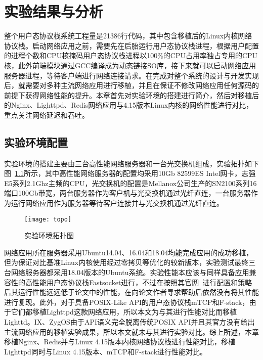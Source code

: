 \chapter{实验结果与分析}

整个用户态协议栈系统工程量是21386行代码，其中包含移植后的Linux内核网络协议栈。启动网络应用之前，需要先在后胎运行用户态协议栈进程，根据用户配置的进程个数和CPU核掩码用户态协议栈进程以100\%的CPU占用率独占专用的CPU核，此外前端模块通过GCC编译成为动态链接SO库，接下来就可以启动网络应用服务器进程，等待客户端进行网络连接请求。在完成对整个系统的设计与开发实现后，就需要对多种主流网络应用进行移植，并且在保证不修改网络应用任何源码的前提下获得网络性能的提升。本章首先对实验环境的搭建进行简介，然后对移植后的Nginx、Lighttpd、Redis网络应用与4.15版本Linux内核的网络性能进行对比，重点关注网络延迟和吞吐。

\section{实验环境配置}
实验环境的搭建主要由三台高性能网络服务器和一台光交换机组成，实验拓扑如下图~\ref{fig:topo}所示，其中高性能网络服务器的配置均采用10Gb 82599ES Intel网卡，志强E5系列2.1Ghz主频的CPU，光交换机的配置是Mellanox公司生产的SN2100系列16端口100Gb带宽，两台服务器作为客户机与光交换机通过光纤直连，一台服务器作为运行网络应用作为服务器等待客户连接并与光交换机通过光纤直连。

\vspace{-10pt}
\begin{figure}[H] %
  \centering
  \texttt{[image: topo]}
  \caption{实验环境拓扑图}
  \label{fig:topo}
\end{figure}
\vspace{-10pt}

网络应用所在服务器采用Ubuntu14.04、16.04和18.04均能完成应用的成功移植，但为保证对比基准Linux内核使用经过零拷贝等优化的较新版本，实验测试最终三台网络服务器都采用18.04版本的Ubuntu系统。实验性能本应该与同样具备应用兼容性的高性能用户态协议栈Fastsocket进行，不过在按照其官网~\cite{fastsocket-release}进行配置和策略后其运行性能远远低于论文中的性能，在向论文作者寻求帮助后依然没有将其性能进行复现。此外，对于具备POSIX-Like API的用户态协议栈mTCP和F-stack，由于它们都移植Lighttpd这款网络应用，所以本文为与其进行性能对比而移植Lighttd。IX、ZygOS由于API语义完全脱离传统POSIX API并且其官方没有给出主流网络应用的移植实验成果，所以本文就未与其进行实验对比。综上所述，本章移植Nginx、Redis并与Linux 4.15版本内核网络协议栈进行性能对比，移植Lighttpd同时与Linux 4.15版本、mTCP和F-stack进行性能对比。

